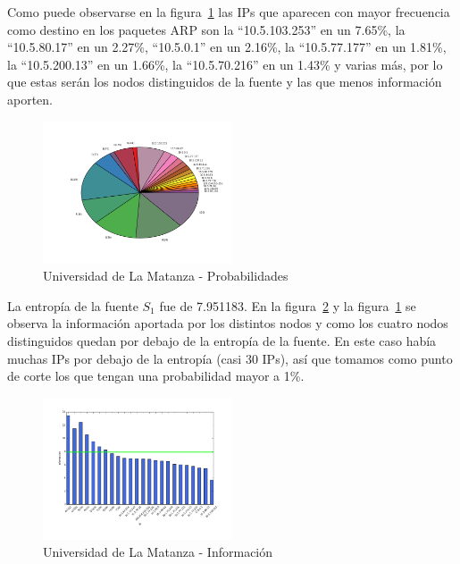 \documentclass[final,inline,narroweqnarray,a4paper]{ieee}
\begin{document}
Como puede observarse en la figura~\ref{torta:universidadLMS1} las IPs que aparecen con mayor frecuencia como destino en los paquetes ARP son la ``10.5.103.253'' en un 7.65\%, la ``10.5.80.17'' en un 2.27\%, ``10.5.0.1'' en un 2.16\%, la ``10.5.77.177'' en un 1.81\%, la ``10.5.200.13'' en un 1.66\%, la ``10.5.70.216'' en un 1.43\% y varias más, por lo que estas serán los nodos distinguidos de la fuente y las que menos información aporten.

\begin{figure}[H]
    \begin{center}
        \includegraphics[width=0.5\textwidth]{plot/facultadS1-pie.png}
        \caption{Universidad de La Matanza - Probabilidades}
        \label{torta:universidadLMS1}
    \end{center}
\end{figure} 

La entropía de la fuente $S_1$ fue de 7.951183. En la figura~\ref{histo:universidadLMS1} y la figura~\ref{torta:universidadLMS1} se observa la información aportada por los distintos nodos y como los cuatro nodos distinguidos quedan por debajo de la entropía de la fuente. En este caso había muchas IPs por debajo de la entropía (casi 30 IPs), así que tomamos como punto de corte los que tengan una probabilidad mayor a 1\%.

\begin{figure}[H]
    \begin{center}
        \includegraphics[width=0.5\textwidth]{plot/facultadS1-bar.png}
        \caption{Universidad de La Matanza - Información}
        \label{histo:universidadLMS1}
    \end{center}
\end{figure}
\end{document}
